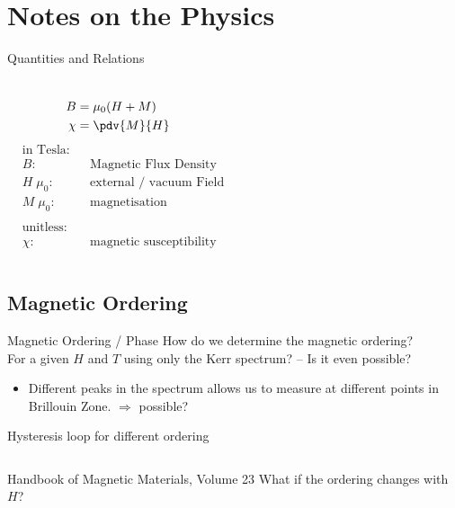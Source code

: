 \section{Notes on the Physics}
\sectionframe

\begin{frame}{Quantities and Relations}
  \begin{columns}
		\begin{align*}
			B &= \mu_0 (H + M) \\
			\chi &= \pdv{M}{H} \\
		\end{align*}
		\begin{align*}
			&\text{in Tesla:}\\
			&B: &&\text{Magnetic Flux Density}\\
			&H\;\mu_0: &&\text{external / vacuum Field}\\
			&M\;\mu_0: &&\text{magnetisation}\\
			\\
			&\text{unitless:}\\
			&\chi: &&\text{magnetic susceptibility}
		\end{align*}
  \end{columns}
\end{frame}

\subsection{Magnetic Ordering}

\begin{frame}{Magnetic Ordering / Phase}
	\centering
	How do we determine the magnetic ordering?\\
	For a given $H$ and $T$ using only the Kerr spectrum? -- Is it even possible?
	\\ \vspace{1em}
	\begin{itemize}
		\item Different peaks in the spectrum allows us to measure at different points in Brillouin Zone. $\Rightarrow$ possible?
	\end{itemize}
\end{frame}

\begin{frame}{Hysteresis loop for different ordering}
	\begin{columns}
		\tiny
		Handbook of Magnetic Materials, Volume 23
		What if the ordering changes with $H$?
	\end{columns}
\end{frame}

